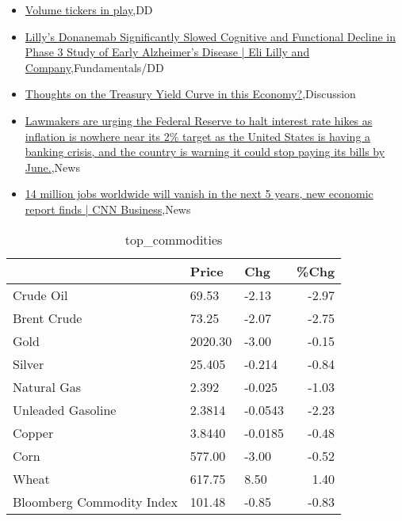 \documentclass{article}%
\begin{document}
%
\begin{itemize}%
\item%
\href{https://reddit.com/r/wallstreetbets/comments/136i98g/volume\_tickers\_in\_play/}{Volume tickers in play},DD%
\item%
\href{https://reddit.com/r/StockMarket/comments/136h0mz/lillys\_donanemab\_significantly\_slowed\_cognitive/}{Lilly's Donanemab Significantly Slowed Cognitive and Functional Decline in Phase 3 Study of Early Alzheimer's Disease | Eli Lilly and Company},Fundamentals/DD%
\item%
\href{https://reddit.com/r/StockMarket/comments/136324j/thoughts\_on\_the\_treasury\_yield\_curve\_in\_this/}{Thoughts on the Treasury Yield Curve in this Economy?},Discussion%
\item%
\href{https://reddit.com/r/StockMarket/comments/1361cgt/lawmakers\_are\_urging\_the\_federal\_reserve\_to\_halt/}{Lawmakers are urging the Federal Reserve to halt interest rate hikes as inflation is nowhere near its 2\% target as the United States is having a banking crisis, and the country is warning it could stop paying its bills by June.},News%
\item%
\href{https://reddit.com/r/Economics/comments/136gb3b/14\_million\_jobs\_worldwide\_will\_vanish\_in\_the\_next/}{14 million jobs worldwide will vanish in the next 5 years, new economic report finds | CNN Business},News%
\end{itemize}%


\begin{table}[htbp]%
\caption{top\_commodities}%
\centering%
\begin{adjustbox}{width=1\textwidth}%
\begin{tabular}{lllr}
\toprule
                          &   Price &     Chg &  \%Chg \\
\midrule
               Crude Oil  &   69.53 &   -2.13 & -2.97 \\
             Brent Crude  &   73.25 &   -2.07 & -2.75 \\
                    Gold  & 2020.30 &   -3.00 & -0.15 \\
                  Silver  &  25.405 &  -0.214 & -0.84 \\
             Natural Gas  &   2.392 &  -0.025 & -1.03 \\
       Unleaded Gasoline  &  2.3814 & -0.0543 & -2.23 \\
                  Copper  &  3.8440 & -0.0185 & -0.48 \\
                    Corn  &  577.00 &   -3.00 & -0.52 \\
                   Wheat  &  617.75 &    8.50 &  1.40 \\
Bloomberg Commodity Index &  101.48 &   -0.85 & -0.83 \\
\bottomrule
\end{tabular}
%
\end{adjustbox}%
\end{table}
\end{document}
